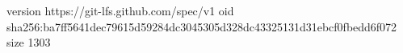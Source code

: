 version https://git-lfs.github.com/spec/v1
oid sha256:ba7ff5641dec79615d59284dc3045305d328dc43325131d31ebcf0fbedd6f072
size 1303
